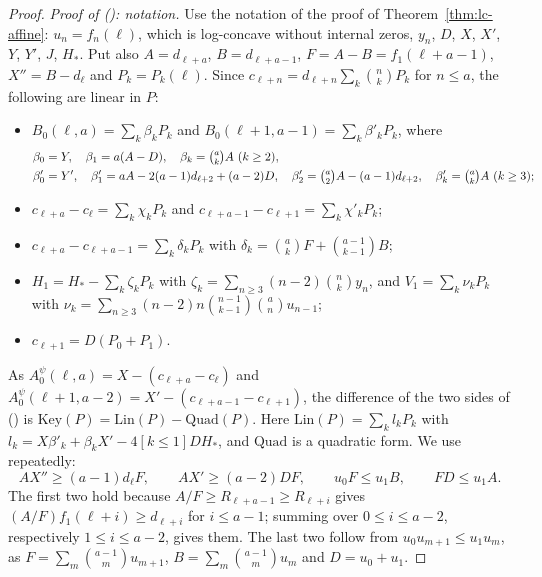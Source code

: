 \documentclass[twoside,10pt]{article}
\numberwithin{equation}{section}
\theoremstyle{slbody}
\theoremstyle{definition}
\theoremstyle{remark}
\renewcommand{\eqref}[1]{\textup{{\normalfont(\oldstylenums{\ref{#1}}}\normalfont)}}
\begin{document}
\begin{proof}
\emph{Proof of \eqref{eq:G-key}: notation.} Use the notation of the proof of Theorem~\ref{thm:lc-affine}: $u_n=f_n(\ell)$, which is log-concave without internal zeros, $y_n$, $D$, $X$, $X'$, $Y$, $Y'$, $J$, $H_*$. Put also $A=d_{\ell+a}$, $B=d_{\ell+a-1}$, $F=A-B=f_1(\ell+a-1)$, $X''=B-d_\ell$ and $P_k=P_k(\ell)$. Since $c_{\ell+n}=d_{\ell+n}\sum_k\binom nkP_k$ for $n\leq a$, the following are linear in $P$:
\begin{itemize}
\item $B_0(\ell,a)=\sum_k\beta_kP_k$ and $B_0(\ell+1,a-1)=\sum_k\beta'_kP_k$, where
\[
\begin{aligned}
&\beta_0=Y,\quad\beta_1=a(A-D),\quad\beta_k=\tbinom akA\ (k\geq2),\\
&\beta'_0=Y',\quad\beta'_1=aA-2(a-1)d_{\ell+2}+(a-2)D,\quad\beta'_2=\tbinom a2A-(a-1)d_{\ell+2},\quad\beta'_k=\tbinom akA\ (k\geq3);
\end{aligned}
\]
\item $c_{\ell+a}-c_\ell=\sum_k\chi_kP_k$ and $c_{\ell+a-1}-c_{\ell+1}=\sum_k\chi'_kP_k$;
\item $c_{\ell+a}-c_{\ell+a-1}=\sum_k\delta_kP_k$ with $\delta_k=\binom akF+\binom{a-1}{k-1}B$;
\item $H_1=H_*-\sum_k\zeta_kP_k$ with $\zeta_k=\sum_{n\geq3}(n-2)\binom nky_n$, and $V_1=\sum_k\nu_kP_k$ with $\nu_k=\sum_{n\geq3}(n-2)n\binom{n-1}{k-1}\binom anu_{n-1}$;
\item $c_{\ell+1}=D(P_0+P_1)$.
\end{itemize}
As $A^\psi_0(\ell,a)=X-(c_{\ell+a}-c_\ell)$ and $A^\psi_0(\ell+1,a-2)=X'-(c_{\ell+a-1}-c_{\ell+1})$, the difference of the two sides of \eqref{eq:G-key} is $\mathrm{Key}(P)=\mathrm{Lin}(P)-\mathrm{Quad}(P)$. Here $\mathrm{Lin}(P)=\sum_kl_kP_k$ with $l_k=X\beta'_k+\beta_kX'-4[k\leq1]DH_*$, and $\mathrm{Quad}$ is a quadratic form. We use repeatedly:
\begin{equation}\label{eq:G-basic}
AX''\geq(a-1)d_\ell F,\qquad AX'\geq(a-2)DF,\qquad u_0F\leq u_1B,\qquad FD\leq u_1A.
\end{equation}
The first two hold because $A/F\geq R_{\ell+a-1}\geq R_{\ell+i}$ gives $(A/F)f_1(\ell+i)\geq d_{\ell+i}$ for $i\leq a-1$; summing over $0\leq i\leq a-2$, respectively $1\leq i\leq a-2$, gives them. The last two follow from $u_0u_{m+1}\leq u_1u_m$, as $F=\sum_m\binom{a-1}mu_{m+1}$, $B=\sum_m\binom{a-1}mu_m$ and $D=u_0+u_1$.


\end{proof}
\end{document}

